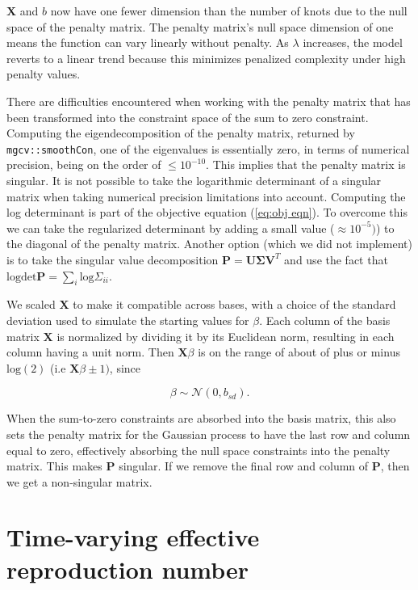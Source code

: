 \documentclass[
11pt, %
oneside, %
english, %
singlespacing, %
]{macthesis} %
\begin{document}
\(\mathbf{X}\) and \(b\) now have one fewer dimension than the number of knots due to the null space of the penalty matrix. The penalty matrix's null space dimension of one means the function can vary linearly without penalty. As \(\lambda\) increases, the model reverts to a linear trend because this minimizes penalized complexity under high penalty values.

There are difficulties encountered when working with the penalty matrix that has been transformed into the constraint space of the sum to zero constraint. Computing the eigendecomposition of the penalty matrix, returned by \texttt{mgcv::smoothCon}, one of the eigenvalues is essentially zero, in terms of numerical precision, being on the order of \(\leq 10^{-10}\). This implies that the penalty matrix is singular. It is not possible to take the logarithmic determinant of a singular matrix when taking numerical precision limitations into account. Computing the log determinant is part of the objective equation (\ref{eq:obj eqn}). To overcome this we can take the regularized determinant by adding a small value (\(\approx 10^{-5})\)) to the diagonal of the penalty matrix. Another option (which we did not implement) is to take the singular value decomposition \(\mathbf{P} = \mathbf{U}\mathbf{\Sigma} \mathbf{V}^T\) and use the fact that \(\text{logdet}\mathbf{P}= \sum_i \text{log}\Sigma_{ii}\).

We scaled \(\mathbf{X}\) to make it compatible across bases, with a choice of the standard deviation used to simulate the starting values for \(\beta\). Each column of the basis matrix \(\mathbf{X}\) is normalized by dividing it by its Euclidean norm, resulting in each column having a unit norm. Then \(\mathbf{X}\beta\) is on the range of about of plus or minus \(\text{log}(2)\) (i.e \(\mathbf{X}\beta \pm 1)\), since

\[
\beta \sim \mathcal{N}(0, b_{sd}).
\]

When the sum-to-zero constraints are absorbed into the basis matrix, this also sets the penalty matrix for the Gaussian process to have the last row and column equal to zero, effectively absorbing the null space constraints into the penalty matrix. This makes \(\mathbf{P}\) singular. If we remove the final row and column of \(\mathbf{P}\), then we get a non-singular matrix.

\section{Time-varying effective reproduction number}\label{Time-varying-effective-reproduction-number}
\end{document}
